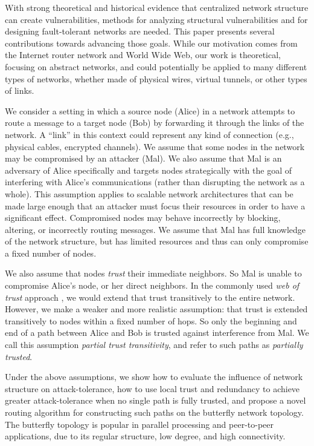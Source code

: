 \documentclass{sig-alternate-05-2015}
\begin{document}
With strong theoretical and historical evidence that centralized
network structure can create vulnerabilities,
methods for analyzing structural vulnerabilities and for designing
fault-tolerant networks are needed.
This paper presents several contributions towards advancing those goals.
While our motivation comes from the Internet router network and
World Wide Web,
our work is theoretical, focusing on abstract networks,
and could potentially be applied to many different types of networks,
whether made of physical wires, virtual tunnels,
or other types of links.

We consider a setting in which a source node (Alice)
in a network attempts to route a message
to a target node (Bob) by forwarding it through the links of the network.
A ``link'' in this context could represent any kind of connection
(e.g., physical cables, encrypted channels).
We assume that some nodes in the network may be compromised by an attacker
(Mal).
We also assume that Mal is an adversary of Alice specifically and targets
nodes strategically with the goal of interfering with Alice's communications
(rather than disrupting the network as a whole).
This assumption applies to scalable network architectures that can be made
large enough that an attacker must focus their resources in order to have
a significant effect.
Compromised nodes may behave incorrectly by blocking, altering,
or incorrectly routing messages.
We assume that Mal has full knowledge of the network structure, but has
limited resources and thus can only compromise a fixed number of nodes.

We also assume that nodes {\em trust} their immediate neighbors.
So Mal is unable to compromise Alice's node, or her direct neighbors.
In the commonly used {\em web of trust} approach
\cite{zimmermann_official_1995,ferguson_practical_2003},
we would extend that trust transitively to the entire network.
However, we make a weaker and more realistic assumption:
that trust is extended transitively to nodes within a fixed
number of hops.
So only the beginning and end of a path between Alice and Bob is trusted
against interference from Mal.
We call this assumption
{\em partial trust transitivity},
and refer to such paths as {\em partially trusted}.

Under the above assumptions,
we show how to evaluate the influence of network structure
on attack-tolerance,
how to use local trust and redundancy to achieve greater attack-tolerance
when no single path is fully trusted,
and propose a novel routing algorithm for constructing such paths on
the butterfly network topology.
The butterfly topology is popular in parallel processing
\cite{kshemkalyani_distributed_2008} and
peer-to-peer \cite{lua_survey_2005, korzun_structured_2013}
applications, due to its regular structure, low degree, and high connectivity.
\end{document}
